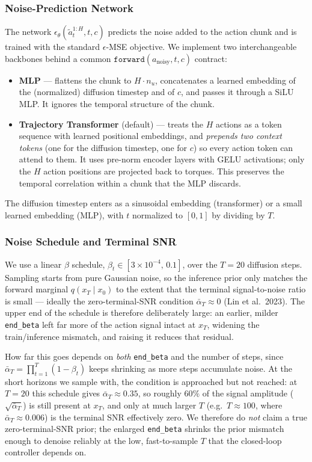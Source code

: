 \documentclass[11pt,a4paper]{article}
\begin{document}
\subsubsection{Noise-Prediction Network}
The network $\epsilon_\theta(\tilde a^{1:H}_t, t, c)$ predicts the noise added to the
action chunk and is trained with the standard $\epsilon$-MSE objective. We implement two 
interchangeable backbones behind a common $\texttt{forward}(a_{\text{noisy}}, t, c)$ contract:
\begin{itemize}[leftmargin=1.5em]
  \item \textbf{MLP} --- flattens the chunk to $H\!\cdot\!n_u$, concatenates a
  learned embedding of the (normalized) diffusion timestep and of $c$, and passes
  it through a SiLU MLP. It ignores the temporal structure of the chunk.
  \item \textbf{Trajectory Transformer} (default) --- treats the $H$ actions as a
  token sequence with learned positional embeddings, and \emph{prepends two context
  tokens} (one for the diffusion timestep, one for $c$) so every action token can
  attend to them. It uses pre-norm encoder layers with GELU activations; only the
  $H$ action positions are projected back to torques. This preserves the temporal
  correlation within a chunk that the MLP discards.
\end{itemize}
The diffusion timestep enters as a sinusoidal embedding (transformer) or a small
learned embedding (MLP), with $t$ normalized to $[0,1]$ by dividing by $T$.

\subsubsection{Noise Schedule and Terminal SNR}
We use a linear $\beta$ schedule, $\beta_t \in [3\times10^{-4},\, 0.1]$, over the
$T = 20$ diffusion steps. Sampling starts from pure Gaussian noise, so the inference
prior only matches the forward marginal $q(x_T \mid x_0)$ to the extent that the
terminal signal-to-noise ratio is small --- ideally the zero-terminal-SNR condition
$\bar\alpha_T \approx 0$ (Lin et al.\ 2023). The upper end of the schedule is
therefore deliberately large: an earlier, milder \texttt{end\_beta} left far more of
the action signal intact at $x_T$, widening the train/inference mismatch, and
raising it reduces that residual.

How far this goes depends on \emph{both} \texttt{end\_beta} and the number of steps,
since $\bar\alpha_T = \prod_{t=1}^{T}(1-\beta_t)$ keeps shrinking as more steps
accumulate noise. At the short horizons we sample with, the condition is approached
but not reached: at $T = 20$ this schedule gives $\bar\alpha_T \approx 0.35$, so
roughly $60\%$ of the signal amplitude ($\sqrt{\bar\alpha_T}$) is still present at
$x_T$, and only at much larger $T$ (e.g.\ $T \approx 100$, where
$\bar\alpha_T \approx 0.006$) is the terminal SNR effectively zero. We therefore do
\emph{not} claim a true zero-terminal-SNR prior; the enlarged \texttt{end\_beta}
shrinks the prior mismatch enough to denoise reliably at the low, fast-to-sample
$T$ that the closed-loop controller depends on.
\end{document}
